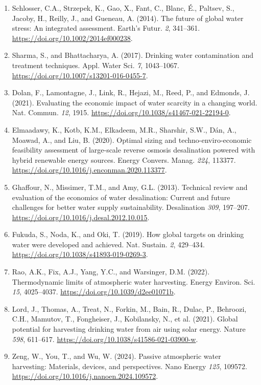 \documentclass[11pt]{article}
\begin{document}
\begin{enumerate}[leftmargin=2em,itemsep=0.25em]
\item Schlosser, C.A., Strzepek, K., Gao, X., Fant, C., Blanc, É., Paltsev, S., Jacoby, H., Reilly, J., and Gueneau, A. (2014). The future of global water stress: An integrated assessment. Earth's Futur. \textit{2}, 341--361. \url{https://doi.org/10.1002/2014ef000238}.
\item Sharma, S., and Bhattacharya, A. (2017). Drinking water contamination and treatment techniques. Appl. Water Sci. \textit{7}, 1043--1067. \url{https://doi.org/10.1007/s13201-016-0455-7}.
\item Dolan, F., Lamontagne, J., Link, R., Hejazi, M., Reed, P., and Edmonds, J. (2021). Evaluating the economic impact of water scarcity in a changing world. Nat. Commun. \textit{12}, 1915. \url{https://doi.org/10.1038/s41467-021-22194-0}.
\item Elmaadawy, K., Kotb, K.M., Elkadeem, M.R., Sharshir, S.W., Dán, A., Moawad, A., and Liu, B. (2020). Optimal sizing and techno-enviro-economic feasibility assessment of large-scale reverse osmosis desalination powered with hybrid renewable energy sources. Energy Convers. Manag. \textit{224}, 113377. \url{https://doi.org/10.1016/j.enconman.2020.113377}.
\item Ghaffour, N., Missimer, T.M., and Amy, G.L. (2013). Technical review and evaluation of the economics of water desalination: Current and future challenges for better water supply sustainability. Desalination \textit{309}, 197--207. \url{https://doi.org/10.1016/j.desal.2012.10.015}.
\item Fukuda, S., Noda, K., and Oki, T. (2019). How global targets on drinking water were developed and achieved. Nat. Sustain. \textit{2}, 429--434. \url{https://doi.org/10.1038/s41893-019-0269-3}.
\item Rao, A.K., Fix, A.J., Yang, Y.C., and Warsinger, D.M. (2022). Thermodynamic limits of atmospheric water harvesting. Energy Environ. Sci. \textit{15}, 4025--4037. \url{https://doi.org/10.1039/d2ee01071b}.
\item Lord, J., Thomas, A., Treat, N., Forkin, M., Bain, R., Dulac, P., Behroozi, C.H., Mamutov, T., Fongheiser, J., Kobilansky, N., et al. (2021). Global potential for harvesting drinking water from air using solar energy. Nature \textit{598}, 611--617. \url{https://doi.org/10.1038/s41586-021-03900-w}.
\item Zeng, W., You, T., and Wu, W. (2024). Passive atmospheric water harvesting: Materials, devices, and perspectives. Nano Energy \textit{125}, 109572. \url{https://doi.org/10.1016/j.nanoen.2024.109572}.

\end{enumerate}
\end{document}
